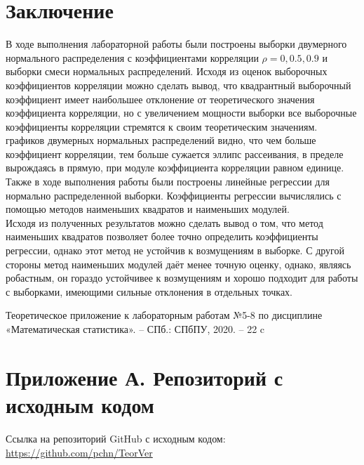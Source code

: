 \documentclass[12pt]{article}
\begin{document}
\newpage
\section*{Заключение}
В ходе выполнения лабораторной работы были построены выборки двумерного нормального распределения с коэффициентами корреляции $\rho = 0, 0.5, 0.9$ и выборки смеси нормальных распределений. Исходя из оценок выборочных коэффициентов корреляции можно сделать вывод, что квадрантный выборочный коэффициент имеет наибольшее отклонение от теоретического значения коэффициента корреляции, но с увеличением мощности выборки все выборочные коэффициенты корреляции стремятся к своим теоретическим значениям.\\
 графиков двумерных нормальных распределений видно, что чем больше коэффициент корреляции, тем больше сужается эллипс рассеивания, в пределе вырождаясь в прямую, при модуле коэффициента корреляции равном единице.\\
Также в ходе выполнения работы были построены линейные регрессии для нормально распределенной выборки. Коэффициенты регрессии вычислялись с помощью методов наименьших квадратов и наименьших модулей.\\
Исходя из полученных результатов можно сделать вывод о том, что метод наименьших квадратов позволяет более точно определить коэффициенты регрессии, однако этот метод не устойчив к возмущениям в выборке. С другой стороны метод наименьших модулей даёт менее точную оценку, однако, являясь робастным, он гораздо устойчивее к возмущениям и хорошо подходит для работы с выборками, имеющими сильные отклонения в отдельных точках.\\

\newpage
{}
\begin{thebibliography}{9}

	Теоретическое приложение к лабораторным работам №5-8 по дисциплине «Математическая статистика». -- СПб.: СПбПУ, 2020. -- 22 c 

\end{thebibliography}
\newpage
\section*{\hypertarget{addition}{Приложение А. Репозиторий с исходным кодом}}
Ссылка на репозиторий GitHub с исходным кодом: \url{https://github.com/pchn/TeorVer}
\end{document}
